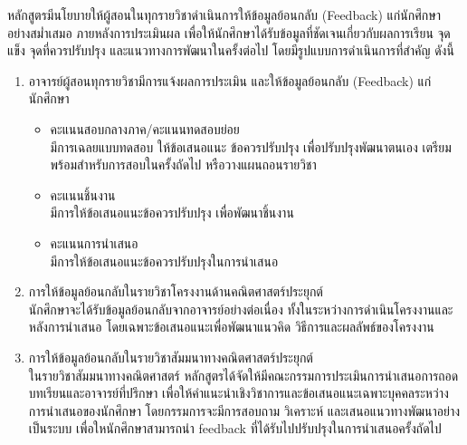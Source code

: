 หลักสูตรมีนโยบายให้ผู้สอนในทุกรายวิชาดำเนินการให้ข้อมูลย้อนกลับ (Feedback) แก่นักศึกษาอย่างสม่ำเสมอ ภายหลังการประเมินผล เพื่อให้นักศึกษาได้รับข้อมูลที่ชัดเจนเกี่ยวกับผลการเรียน จุดแข็ง จุดที่ควรปรับปรุง และแนวทางการพัฒนาในครั้งต่อไป โดยมีรูปแบบการดำเนินการที่สำคัญ ดังนี้
\begin{enumerate}
	\item  อาจารย์ผู้สอนทุกรายวิชามีการแจ้งผลการประเมิน และให้ข้อมูลย้อนกลับ (Feedback) แก่นักศึกษา
	\begin{itemize}
		\item คะแนนสอบกลางภาค/คะแนนทดสอบย่อย\\
		มีการเฉลยแบบทดสอบ ให้ข้อเสนอแนะ ข้อควรปรับปรุง เพื่อปรับปรุงพัฒนาตนเอง เตรียมพร้อมสำหรับการสอบในครั้งถัดไป หรือวางแผนถอนรายวิชา
		\item คะแนนชิ้นงาน \\มีการให้ข้อเสนอแนะข้อควรปรับปรุง เพื่อพัฒนาชิ้นงาน
		\item คะแนนการนำเสนอ \\มีการให้ข้อเสนอแนะข้อควรปรับปรุงในการนำเสนอ
	\end{itemize} 
	\item การให้ข้อมูลย้อนกลับในรายวิชาโครงงานด้านคณิตศาสตร์ประยุกต์\\
นักศึกษาจะได้รับข้อมูลย้อนกลับจากอาจารย์อย่างต่อเนื่อง ทั้งในระหว่างการดำเนินโครงงานและหลังการนำเสนอ โดยเฉพาะข้อเสนอแนะเพื่อพัฒนาแนวคิด วิธีการและผลลัพธ์ของโครงงาน
	\item การให้ข้อมูลย้อนกลับในรายวิชาสัมมนาทางคณิตศาสตร์ประยุกต์\\
ในรายวิชาสัมมนาทางคณิตศาสตร์ หลักสูตรได้จัดให้มีคณะกรรมการประเมินการนำเสนอการถอดบทเรียนและอาจารย์ที่ปรึกษา เพื่อให้คำแนะนำเชิงวิชาการและข้อเสนอแนะเฉพาะบุคคลระหว่างการนำเสนอของนักศึกษา โดยกรรมการจะมีการสอบถาม วิเคราะห์ และเสนอแนวทางพัฒนาอย่างเป็นระบบ เพื่อใหนักศึกษาสามารถนำ feedback ที่ได้รับไปปรับปรุงในการนำเสนอครั้งถัดไป
	\end{enumerate}



